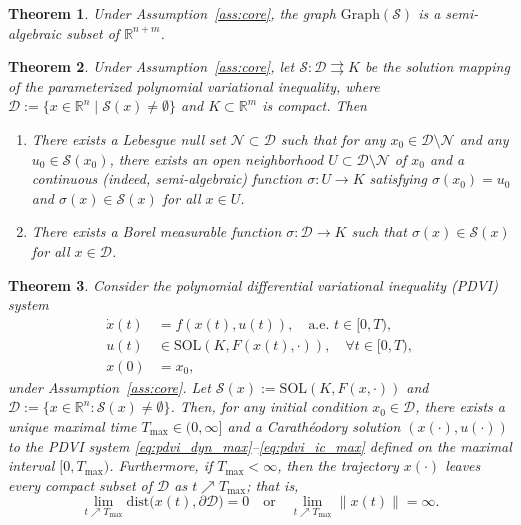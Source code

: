 \documentclass[10pt,a4paper]{amsart}
\newtheorem{theorem}{Theorem}
\newcommand{\SOL}{\mathrm{SOL}}
\begin{document}
\begin{theorem} \label{thm:eq-semi-graph}
Under Assumption~\ref{ass:core}, the graph $\mathrm{Graph}(\mathcal{S})$ is a semi-algebraic subset of $\mathbb{R}^{n+m}$.
\end{theorem}

\begin{theorem} \label{thm:selection}
Under Assumption~\ref{ass:core}, let $\mathcal{S}: \mathcal{D} \rightrightarrows K$ be the solution mapping of the parameterized polynomial variational inequality, where $\mathcal{D} := \{x \in \mathbb{R}^n \mid \mathcal{S}(x) \neq \emptyset\}$ and $K \subset \mathbb{R}^m$ is compact. Then
\begin{enumerate}
    \item There exists a Lebesgue null set $\mathcal{N} \subset \mathcal{D}$ such that for any $x_0 \in \mathcal{D} \setminus \mathcal{N}$ and any $u_0 \in \mathcal{S}(x_0)$, there exists an open neighborhood $U \subset \mathcal{D} \setminus \mathcal{N}$ of $x_0$ and a continuous (indeed, semi-algebraic) function $\sigma: U \to K$ satisfying $\sigma(x_0) = u_0$ and $\sigma(x) \in \mathcal{S}(x)$ for all $x \in U$.
    \item There exists a Borel measurable function $\sigma: \mathcal{D} \to K$ such that $\sigma(x) \in \mathcal{S}(x)$ for all $x \in \mathcal{D}$.
\end{enumerate}
\end{theorem}

\begin{theorem} \label{thm:maximal_existence}
Consider the polynomial differential variational inequality (PDVI) system
\begin{subequations}
\begin{align}
\dot{x}(t) &= f(x(t), u(t)), \quad \text{a.e. } t \in [0, T), \label{eq:pdvi_dyn_max} \\
u(t) &\in \SOL(K, F(x(t), \cdot)), \quad \forall t \in [0, T), \label{eq:pdvi_vi_max} \\
x(0) &= x_0, \label{eq:pdvi_ic_max}
\end{align}
\end{subequations}
under Assumption~\ref{ass:core}. Let $\mathcal{S}(x) := \SOL(K, F(x, \cdot))$ and $\mathcal{D} := \{x \in \mathbb{R}^n : \mathcal{S}(x) \neq \emptyset\}$. Then, for any initial condition $x_0 \in \mathcal{D}$, there exists a unique maximal time $T_{\max} \in (0, \infty]$ and a Carath\'{e}odory solution $(x(\cdot), u(\cdot))$ to the PDVI system \eqref{eq:pdvi_dyn_max}--\eqref{eq:pdvi_ic_max} defined on the maximal interval $[0, T_{\max})$. Furthermore, if $T_{\max} < \infty$, then the trajectory $x(\cdot)$ leaves every compact subset of $\mathcal{D}$ as $t \nearrow T_{\max}$; that is,
\[ 
\lim_{t \nearrow T_{\max}} \mathrm{dist}\big(x(t), \partial \mathcal{D}\big) = 0 
\quad \text{or} \quad 
\lim_{t \nearrow T_{\max}} \|x(t)\| = \infty.
\]
\end{theorem}
\end{document}
